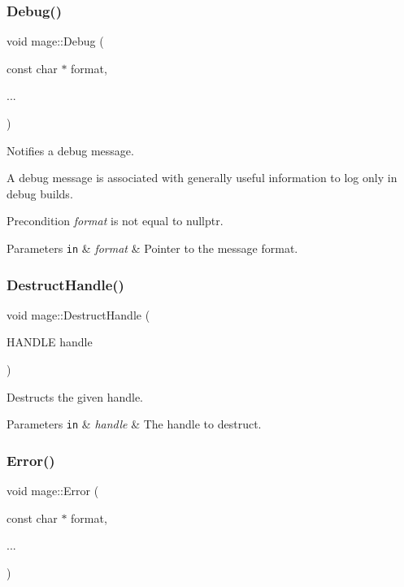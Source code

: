 \subsubsection{\texorpdfstring{Debug()}{Debug()}}
{\footnotesize\ttfamily void mage\+::\+Debug (\begin{DoxyParamCaption}\item[{const char $\ast$}]{format,  }\item[{}]{... }\end{DoxyParamCaption})}

Notifies a debug message.

A debug message is associated with generally useful information to log only in debug builds.

\begin{DoxyPrecond}{Precondition}
{\itshape format} is not equal to {\ttfamily nullptr}. 
\end{DoxyPrecond}

\begin{DoxyParams}[1]{Parameters}
\mbox{\tt in}  & {\em format} & Pointer to the message format. \\
\hline
\end{DoxyParams}
\hypertarget{namespacemage_a7bf12816896ea8d126d397f0c6d571b1}{}\label{namespacemage_a7bf12816896ea8d126d397f0c6d571b1} 
\subsubsection{\texorpdfstring{Destruct\+Handle()}{DestructHandle()}}
{\footnotesize\ttfamily void mage\+::\+Destruct\+Handle (\begin{DoxyParamCaption}\item[{H\+A\+N\+D\+LE}]{handle }\end{DoxyParamCaption})}

Destructs the given handle.


\begin{DoxyParams}[1]{Parameters}
\mbox{\tt in}  & {\em handle} & The handle to destruct. \\
\hline
\end{DoxyParams}
\hypertarget{namespacemage_a52a7fe8c9ce39afd9e0b0299373db0fa}{}\label{namespacemage_a52a7fe8c9ce39afd9e0b0299373db0fa} 
\subsubsection{\texorpdfstring{Error()}{Error()}}
{\footnotesize\ttfamily void mage\+::\+Error (\begin{DoxyParamCaption}\item[{const char $\ast$}]{format,  }\item[{}]{... }\end{DoxyParamCaption})}

